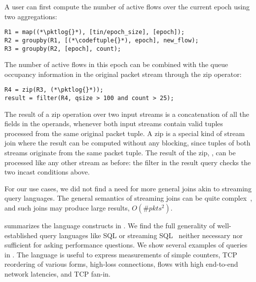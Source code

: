 

A user can first compute the number of active flows over the current epoch using
two aggregations:
\begin{lstlisting}
R1 = map((*\pktlog{}*), [tin/epoch_size], [epoch]);
R2 = groupby(R1, [(*\codeftuple{}*), epoch], new_flow);
R3 = groupby(R2, [epoch], count);
\end{lstlisting}
The number of active flows in this epoch can be combined with the queue
occupancy information in the original packet stream through the {\ct zip}
operator:
\begin{lstlisting}
R4 = zip(R3, (*\pktlog{}*));
result = filter(R4, qsize > 100 and count > 25);
\end{lstlisting}
The result of a {\ct zip} operation over two input streams is a concatenation of
all the fields in the operands, whenever both input streams contain valid tuples
processed from the same original packet tuple. A {\ct zip} is a special kind of
stream join where the result can be computed without any blocking, since tuples
of both streams originate from the same packet tuple. The result of the {\ct
  zip}, , can be processed like any other stream as before: the {\ct
  filter} in the {\ct result} query checks the two incast conditions above.

For our use cases, we did not find a need for more general joins akin to
streaming query languages. The general semantics of streaming joins can be quite
complex~\cite{cql-vldb}, and such joins may produce large results, \ie
$O(\#pkts^2)$.

 summarizes the language constructs in
\TheSystem. We find the full generality of well-established query languages like
SQL or streaming SQL~\cite{aurora, sparksql} neither necessary nor sufficient
for asking performance questions. We show several examples of \TheSystem queries
in . The language is useful to express measurements of
simple counters, TCP reordering of various forms, high-loss connections, flows
with high end-to-end network latencies, and TCP fan-in.


